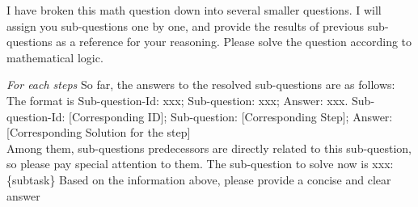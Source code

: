 I have broken this math question down into several smaller questions. I will assign you sub-questions one by one, and provide the results of previous sub-questions as a reference for your reasoning.
Please solve the question according to mathematical logic.

\textit{For each steps}
So far, the answers to the resolved sub-questions are as follows: The format is Sub-question-Id: xxx; Sub-question: xxx; Answer: xxx.
Sub-question-Id: [Corresponding ID]; Sub-question: [Corresponding Step]; Answer: [Corresponding Solution for the step]\\
Among them, sub-questions {predecessors} are directly related to this sub-question, so please pay special attention to them.
The sub-question to solve now is xxx: \{subtask\}
Based on the information above, please provide a concise and clear answer










